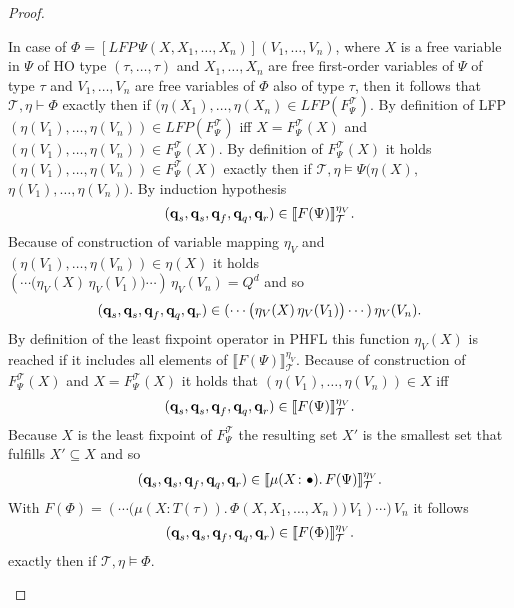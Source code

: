 \begin{proof}
\begin{compactitem}
        \item In case of $\Phi = [LFP\,\Psi(X, X_1, \dots, X_n)](V_1, \dots, V_n)$, where $X$ is a
        free variable in $\Psi$ of HO type $(\tau, \dots, \tau)$ and $X_1, \dots, X_n$ are free first-order
        variables of $\Psi$ of type $\tau$ and $V_1, \dots, V_n$ are free variables of $\Phi$ also of type $\tau$, then
        it follows that $\mathcal{T}, \eta \vdash \Phi$ exactly then if $(\eta(X_1), \dots, \eta(X_n) \in LFP
        (F_\Psi^\mathcal{T})$. By definition of LFP $(\eta(V_1), \dots, \eta(V_n)) \in
        LFP(F_\Psi^\mathcal{T})$ iff $X = F_\Psi^\mathcal{T}(X)$ and $(\eta(V_1), \dots, \eta(V_n)) \in
        F_\Psi^\mathcal{T}(X)$. By definition of $F_\Psi^\mathcal{T}(X)$ it holds $(\eta
        (V_1), \dots, \eta(V_n)) \in F_\Psi^\mathcal{T}(X)$ exactly then if $\mathcal{T}, \eta \models \Psi
        (\eta(X), $ $\eta(V_1), \dots, \eta(V_n))$. By induction hypothesis
        \[(\emph{q}_s, \emph{q}_s, \emph{q}_f, \emph{q}_q, \emph{q}_r) \in \llbracket  F(\Psi)
        \rrbracket^{\eta_V}_\mathcal{T}.\]
        Because of construction of variable mapping $\eta_V$ and $(\eta(V_1), \dots, \eta(V_n)) \in \eta(X)$ it holds
        $(\dotsb\big(\eta_V(X)\,\eta_V(V_1)\big) \dotsb )\,\eta_V(V_n) = Q^d$
        and so 
        \begin{align*}
        (\emph{q}_s, \emph{q}_s, \emph{q}_f, \emph{q}_q, \emph{q}_r) \in (\dotsb \big(\eta_V(X)\,\eta_V(V_1)\big) \dotsb )\,\eta_V(V_n).\end{align*} By definition of the least fixpoint operator in PHFL this function
        $\eta_V(X)$ is reached if it includes all
        elements of $\llbracket  F(\Psi) \rrbracket^{\eta_V}_\mathcal{T}$. Because of
        construction of $F_\Psi^\mathcal{T}(X)$ and $X = F_\Psi^\mathcal{T}(X)$ it holds that $(\eta(V_{1}),
        \dots, \eta(V_{n})) \in X$ iff
        \[(\emph{q}_s, \emph{q}_s, \emph{q}_f, \emph{q}_q, \emph{q}_r) \in \llbracket
         F(\Psi) \rrbracket^{\eta_V}_\mathcal{T}.\]
        Because $X$ is the least fixpoint of $F_\Psi^\mathcal{T}$ the resulting set $X'$ is the smallest set that
        fulfills $X' \subseteq X$ and so
        \[(\emph{q}_s, \emph{q}_s, \emph{q}_f, \emph{q}_q, \emph{q}_r) \in \llbracket
         \mu(X\colon \bullet).\,F(\Psi) \rrbracket^{\eta_V}_\mathcal{T}.\]
        With $F(\Phi) = (\dotsb \big(\mu (X \colon T(\tau)).\,\Phi(X, X_1, \dots, X_n)\big)\,V_1)\dotsb)\,V_n$ it follows
        \[(\emph{q}_s, \emph{q}_s, \emph{q}_f, \emph{q}_q, \emph{q}_r) \in \llbracket
         F(\Phi) \rrbracket^{\eta_V}_\mathcal{T}.\]
        exactly then if $\mathcal{T}, \eta \models \Phi$.
    \end{compactitem}
\end{proof}

